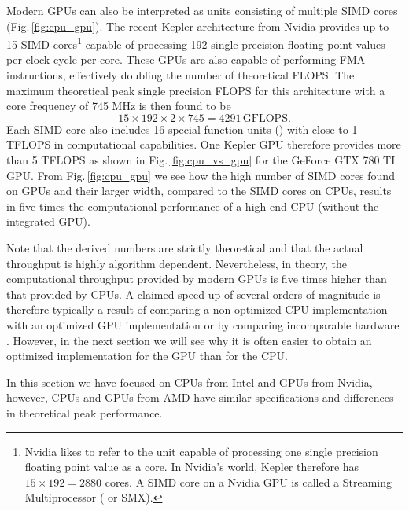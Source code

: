 Modern GPUs can also be interpreted as units consisting of multiple SIMD cores (Fig.\,\ref{fig:cpu_gpu}). The recent Kepler architecture from Nvidia provides up to 15 SIMD cores\footnote{Nvidia likes to refer to the unit capable of processing one single precision floating point value as a core. In Nvidia's world, Kepler therefore has $15\times192=2880$ cores. A SIMD core on a Nvidia GPU is called a Streaming Multiprocessor ( or SMX).} capable of processing 192 single-precision floating point values per clock cycle per core. These GPUs are also capable of performing FMA instructions, effectively doubling the number of theoretical FLOPS. The maximum theoretical peak single precision FLOPS for this architecture with a core frequency of 745 MHz is then found to be
\begin{equation}
15 \times 192 \times 2 \times 745 = 4291\,\text{GFLOPS}.
\end{equation} 
Each SIMD core also includes 16 special function units () with close to 1 TFLOPS in computational capabilities. One Kepler GPU therefore provides more than 5 TFLOPS as shown in Fig.\,\ref{fig:cpu_vs_gpu} for the GeForce GTX 780 TI GPU. From Fig.\,\ref{fig:cpu_gpu} we see how the high number of SIMD cores found on GPUs and their larger width, compared to the SIMD cores on CPUs, results in five times the computational performance of a high-end CPU (without the integrated GPU). 

Note that the derived numbers are strictly theoretical and that the actual throughput is highly algorithm dependent. Nevertheless, in theory, the computational throughput provided by modern GPUs is five times higher than that provided by CPUs. A claimed speed-up of several orders of magnitude is therefore typically a result of comparing a non-optimized CPU implementation with an optimized GPU implementation or by comparing incomparable hardware \cite{Lee2010, Kothapalli2013}. However, in the next section we will see why it is often easier to obtain an optimized implementation for the GPU than for the CPU.

In this section we have focused on CPUs from Intel and GPUs from Nvidia, however, CPUs and GPUs from AMD have similar specifications and differences in theoretical peak performance. 

